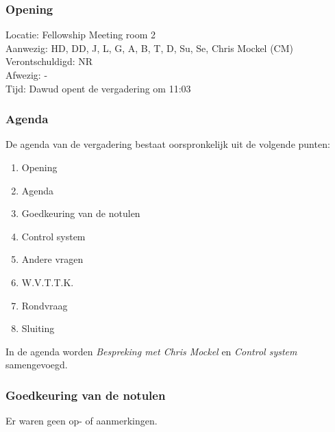 \subsubsection{Opening}
Locatie: Fellowship Meeting room 2\\
Aanwezig: HD, DD, J, L, G, A, B, T, D, Su, Se, Chris Mockel (CM)\\
Verontschuldigd: NR \\
Afwezig: - \\
Tijd: Dawud opent de vergadering om 11:03\\

\subsubsection{Agenda}
De agenda van de vergadering bestaat oorspronkelijk uit de volgende punten:
\begin{enumerate}
\item Opening
\item Agenda
\item Goedkeuring van de notulen
\item Control system
\item Andere vragen
\item W.V.T.T.K.
\item Rondvraag
\item Sluiting
\end{enumerate}

In de agenda worden \textit{Bespreking met Chris Mockel} en \textit{Control system} samengevoegd.

\subsubsection{Goedkeuring van de notulen}
Er waren geen op- of aanmerkingen.

